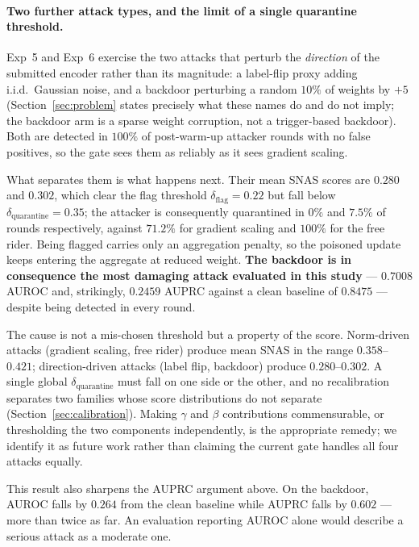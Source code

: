 \documentclass[pdflatex,sn-mathphys-num]{sn-jnl}
\begin{document}
\paragraph{Two further attack types, and the limit of a single quarantine threshold.} Exp~5 and Exp~6 exercise the two attacks that perturb the \emph{direction} of the submitted encoder rather than its magnitude: a label-flip proxy adding i.i.d.\ Gaussian noise, and a backdoor perturbing a random $10\%$ of weights by $+5$ (Section~\ref{sec:problem} states precisely what these names do and do not imply; the backdoor arm is a sparse weight corruption, not a trigger-based backdoor). Both are detected in $100\%$ of post-warm-up attacker rounds with no false positives, so the gate sees them as reliably as it sees gradient scaling.

What separates them is what happens next. Their mean SNAS scores are $0.280$ and $0.302$, which clear the flag threshold $\delta_{\mathrm{flag}}=0.22$ but fall below $\delta_{\mathrm{quarantine}}=0.35$; the attacker is consequently quarantined in $0\%$ and $7.5\%$ of rounds respectively, against $71.2\%$ for gradient scaling and $100\%$ for the free rider. Being flagged carries only an aggregation penalty, so the poisoned update keeps entering the aggregate at reduced weight. \textbf{The backdoor is in consequence the most damaging attack evaluated in this study} --- $0.7008$ AUROC and, strikingly, $0.2459$ AUPRC against a clean baseline of $0.8475$ --- despite being detected in every round.

The cause is not a mis-chosen threshold but a property of the score. Norm-driven attacks (gradient scaling, free rider) produce mean SNAS in the range $0.358$--$0.421$; direction-driven attacks (label flip, backdoor) produce $0.280$--$0.302$. A single global $\delta_{\mathrm{quarantine}}$ must fall on one side or the other, and no recalibration separates two families whose score distributions do not separate (Section~\ref{sec:calibration}). Making $\gamma$ and $\beta$ contributions commensurable, or thresholding the two components independently, is the appropriate remedy; we identify it as future work rather than claiming the current gate handles all four attacks equally.

This result also sharpens the AUPRC argument above. On the backdoor, AUROC falls by $0.264$ from the clean baseline while AUPRC falls by $0.602$ --- more than twice as far. An evaluation reporting AUROC alone would describe a serious attack as a moderate one.
\end{document}
